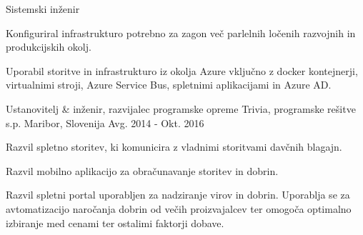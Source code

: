 \begin{cventries}
{\begin{cvitems}
      \end{cvitems}
    }
    \cventry
    {Sistemski inženir} %
    {} %
    {} %
    {} %
    {
      \begin{cvitems} %
        \item {Konfiguriral infrastrukturo potrebno za zagon več parlelnih ločenih razvojnih in produkcijskih okolj.}
        \item {Uporabil storitve in infrastrukturo iz okolja Azure vključno z docker kontejnerji, virtualnimi stroji, Azure Service Bus, spletnimi aplikacijami in Azure AD.\\}
      \end{cvitems}
    }

  \cventry
    {Ustanovitelj \& inženir, razvijalec programske opreme} %
    {Trivia, programske rešitve s.p.} %
    {Maribor, Slovenija} %
    {Avg. 2014 - Okt. 2016} %
    {
      \begin{cvitems} %
        \item {Razvil spletno storitev, ki komunicira z vladnimi storitvami davčnih blagajn.}
        \item {Razvil mobilno aplikacijo za obračunavanje storitev in dobrin.}
        \item {Razvil spletni portal uporabljen za nadziranje virov in dobrin. Uporablja se za avtomatizacijo naročanja dobrin od večih proizvajalcev ter omogoča optimalno izbiranje med cenami ter ostalimi faktorji dobave.}
      \end{cvitems}
    }

\end{cventries}
